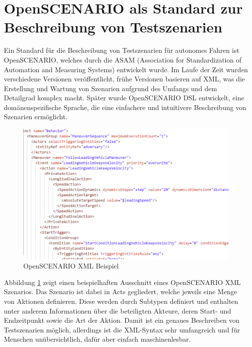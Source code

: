 \section{OpenSCENARIO als Standard zur Beschreibung von Testszenarien}



Ein Standard für die Beschreibung von Testszenarien für autonomes Fahren ist OpenSCENARIO, welches durch die ASAM (Association for Standardization of Automation and Measuring Systems) entwickelt wurde.
Im Laufe der Zeit wurden verschiedene Versionen veröffentlicht, frühe Versionen basieren auf XML, was die Erstellung und Wartung von Szenarien aufgrund des Umfangs und dem Detailgrad komplex macht.
Später wurde OpenSCENARIO DSL entwickelt, eine domänenspezifische Sprache, die eine einfachere und intuitivere Beschreibung von Szenarien ermöglicht.

\begin{figure}[h]
    \centering
    \includegraphics[width=0.85\linewidth]{contents/figures/openscenario_xml.png}
    \caption{OpenSCENARIO XML Beispiel \cite{EinfuehrungIntegrationsprojekt}}
    \label{fig:osl-xml}
\end{figure}

Abbildung \ref{fig:osl-xml} zeigt einen beispielhaften Ausschnitt eines OpenSCENARIO XML Szenarios.
Das Szenario ist dabei in \glqq Acts\grqq{} gegliedert, welche jeweils eine Menge von Aktionen definieren.
Diese werden durch Subtypen definiert und enthalten unter anderem Informationen über die beteiligten Akteure, deren Start- und Endzeitpunkt sowie die Art der Aktion.
Damit ist ein genaues Beschreiben von Testszenarien möglich, allerdings ist die XML-Syntax sehr umfangreich und für Menschen unübersichtlich, dafür aber einfach maschinenlesbar.



